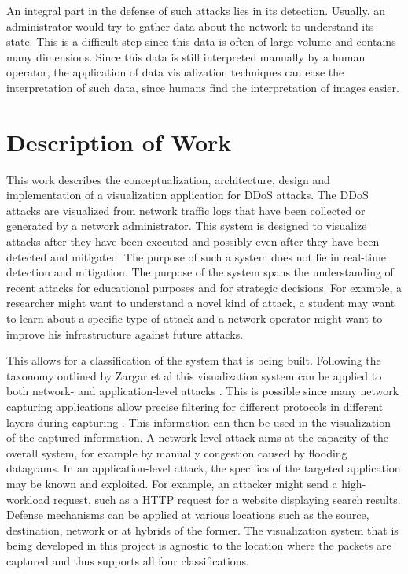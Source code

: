 An integral part in the defense of such attacks lies in its detection. Usually, an administrator would try to gather data about the network to understand its state. This is a difficult step since this data is often of large volume and contains many dimensions.
Since this data is still interpreted manually by a human operator, the application of data visualization techniques can ease the interpretation of such data, since humans find the interpretation of images easier\cite{wu}.

\section{Description of Work}
This work describes the conceptualization, architecture, design and implementation of a visualization application for DDoS attacks.
The DDoS attacks are visualized from network traffic logs that have been collected or generated by a network administrator. This system is designed to visualize attacks after they have been executed and possibly even after they have been detected and mitigated. The purpose of such a system does not lie in real-time detection and mitigation. The purpose of the system spans the understanding of recent attacks for educational purposes and for strategic decisions. For example, a researcher might want to understand a novel kind of attack, a student may want to learn about a specific type of attack and a network operator might want to improve his infrastructure against future attacks.

This allows for a classification of the system that is being built. Following the taxonomy outlined by Zargar et al this visualization system can be applied to both network- and application-level attacks \cite{zargar}. This is possible since many network capturing applications allow precise filtering for different protocols in different layers during capturing \cite{tcpdump}. This information can then be used in the visualization of the captured information.
A network-level attack aims at the capacity of the overall system, for example by manually congestion caused by flooding datagrams. In an application-level attack, the specifics of the targeted application may be known and exploited. For example, an attacker might send a high-workload request, such as a HTTP request for a website displaying search results.
Defense mechanisms can be applied at various locations such as the source, destination, network or at hybrids of the former.
The visualization system that is being developed in this project is agnostic to the location where the packets are captured and thus supports all four classifications.

